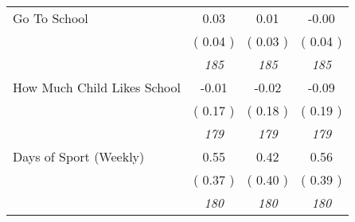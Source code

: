 \begin{tabular}{l c c c}
Go To School &      0.03 &      0.01 &     -0.00 \\
& (     0.04 ) & (     0.03 ) & (     0.04 ) \\
& \textit{ 185 } & \textit{ 185 } & \textit{ 185 } \\
How Much Child Likes School &     -0.01 &     -0.02 &     -0.09 \\
& (     0.17 ) & (     0.18 ) & (     0.19 ) \\
& \textit{ 179 } & \textit{ 179 } & \textit{ 179 } \\
Days of Sport (Weekly) &      0.55 &      0.42 &      0.56 \\
& (     0.37 ) & (     0.40 ) & (     0.39 ) \\
& \textit{ 180 } & \textit{ 180 } & \textit{ 180 } \\
\bottomrule
\end{tabular}
